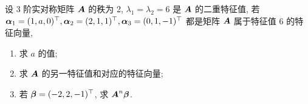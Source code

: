 

\begin{example}
    设 3 阶实对称矩阵 $\vb*{A}$ 的秩为 2, $\lambda_1= \lambda_2=6$ 是 $\vb*{A}$ 的二重特征值, 若 $\vb*{\alpha}_1=(1,a,0)^\top,\vb*{\alpha}_2=(2,1,1)^\top,\vb*{\alpha}_3=(0,1,-1)^\top$ 都是矩阵 $\vb*{A}$ 属于特征值 6 的特征向量,
    \begin{enumerate}[label=(\arabic{*})]
        \item 求 $a$ 的值;
        \item 求 $\vb*{A}$ 的另一特征值和对应的特征向量;
        \item 若 $\vb*{\beta}=(-2,2,-1)^\top$, 求 $\vb*{A}^{n}\vb*{\beta}$.
    \end{enumerate}
\end{example}
